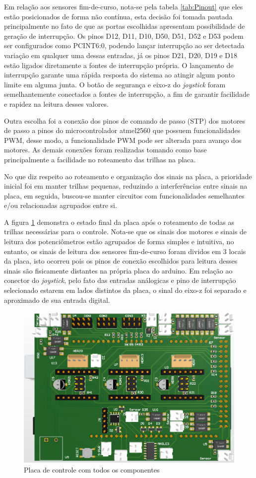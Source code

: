Em relação aos sensores fim-de-curso, nota-se pela tabela \ref{tab:Pinout}
que eles estão posicionados de forma não contínua, esta decisão foi tomada
pautada principalmente no fato de que as portas escolhidas apresentam
possibilidade de geração de interrupção. Os pinos D12, D11, D10, D50, D51,
D52 e D53 podem ser configurados como PCINT6:0, podendo lançar interrupção
ao ser detectada variação em qualquer uma dessas entradas, já os pinos
D21, D20, D19 e D18 estão ligados diretamente a fontes de interrupção
própria. O lançamento de interrupção garante uma rápida resposta
do sistema ao atingir algum ponto limite em alguma junta. O botão de 
segurança e eixo-z do \textit{joystick} foram semelhantemente conectados
a fontes de interrupção, a fim de garantir facilidade e rapidez na leitura desses
valores.

Outra escolha foi a conexão dos pinos de comando de passo (STP) dos
motores de passo a pinos do microcontrolador atmel2560 que possuem
funcionalidades PWM, desse modo, a funcionalidade PWM pode ser alterada
para avanço dos motores. 
As demais conexões foram realizadas tomando como base principalmente 
a facilidade no roteamento das trilhas na placa.

No que diz respeito ao roteamento e organização dos sinais na placa, 
a prioridade inicial foi em manter trilhas pequenas, reduzindo a 
interferências entre sinais na placa, em seguida, buscou-se manter 
circuitos com funcionalidades semelhantes e/ou relacionadas agrupados
entre si.

A figura \ref{fig:Placa-controle} demonstra o estado final da placa 
após o roteamento de todas as trilhas necessárias para o controle.
Nota-se que os sinais dos motores e sinais de leitura dos potenciômetros
estão agrupados de forma simples e intuitiva, no entanto, os sinais de 
leitura dos sensores fim-de-curso foram dividos em 3 locais da placa, 
isto ocorreu pois os pinos de conexão escolhidos para leitura desses 
sinais são fisicamente distantes na própria placa do arduino. Em 
relação ao conector do \textit{joystick}, pelo fato das entradas análogicas e 
pino de interrupção selecionado estarem em lados distintos da placa, o
sinal do eixo-z foi separado e aproximado de sua entrada digital.

\begin{figure}[h]
    \caption{Placa de controle com todos os componentes}    
    \begin{centering}

        \includegraphics[width=0.8\columnwidth]{images/pcbs/MainPCB-Board.png}
    
    \par\end{centering}

    \label{fig:Placa-controle}
\end{figure}